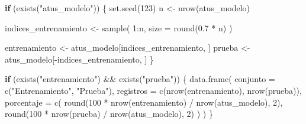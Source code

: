 \documentclass[
  11pt,
  letterpaper,
]{book}
\newenvironment{Shaded}{\begin{snugshade}}{\end{snugshade}}
\newcommand{\AttributeTok}[1]{\textcolor[rgb]{0.40,0.45,0.13}{#1}}
\newcommand{\ControlFlowTok}[1]{\textcolor[rgb]{0.00,0.23,0.31}{\textbf{#1}}}
\newcommand{\DecValTok}[1]{\textcolor[rgb]{0.68,0.00,0.00}{#1}}
\newcommand{\FloatTok}[1]{\textcolor[rgb]{0.68,0.00,0.00}{#1}}
\newcommand{\FunctionTok}[1]{\textcolor[rgb]{0.28,0.35,0.67}{#1}}
\newcommand{\NormalTok}[1]{\textcolor[rgb]{0.00,0.23,0.31}{#1}}
\newcommand{\OtherTok}[1]{\textcolor[rgb]{0.00,0.23,0.31}{#1}}
\newcommand{\SpecialCharTok}[1]{\textcolor[rgb]{0.37,0.37,0.37}{#1}}
\newcommand{\StringTok}[1]{\textcolor[rgb]{0.13,0.47,0.30}{#1}}
\begin{document}
\begin{Shaded}
\begin{Highlighting}[]
\ControlFlowTok{if}\NormalTok{ (}\FunctionTok{exists}\NormalTok{(}\StringTok{"atus\_modelo"}\NormalTok{)) \{}
  \FunctionTok{set.seed}\NormalTok{(}\DecValTok{123}\NormalTok{)}
\NormalTok{  n }\OtherTok{\textless{}{-}} \FunctionTok{nrow}\NormalTok{(atus\_modelo)}

\NormalTok{  indices\_entrenamiento }\OtherTok{\textless{}{-}} \FunctionTok{sample}\NormalTok{(}
    \DecValTok{1}\SpecialCharTok{:}\NormalTok{n,}
    \AttributeTok{size =} \FunctionTok{round}\NormalTok{(}\FloatTok{0.7} \SpecialCharTok{*}\NormalTok{ n)}
\NormalTok{  )}

\NormalTok{  entrenamiento }\OtherTok{\textless{}{-}}\NormalTok{ atus\_modelo[indices\_entrenamiento, ]}
\NormalTok{  prueba }\OtherTok{\textless{}{-}}\NormalTok{ atus\_modelo[}\SpecialCharTok{{-}}\NormalTok{indices\_entrenamiento, ]}
\NormalTok{\}}
\end{Highlighting}
\end{Shaded}

\begin{Shaded}
\begin{Highlighting}[]
\ControlFlowTok{if}\NormalTok{ (}\FunctionTok{exists}\NormalTok{(}\StringTok{"entrenamiento"}\NormalTok{) }\SpecialCharTok{\&\&} \FunctionTok{exists}\NormalTok{(}\StringTok{"prueba"}\NormalTok{)) \{}
  \FunctionTok{data.frame}\NormalTok{(}
    \AttributeTok{conjunto =} \FunctionTok{c}\NormalTok{(}\StringTok{"Entrenamiento"}\NormalTok{, }\StringTok{"Prueba"}\NormalTok{),}
    \AttributeTok{registros =} \FunctionTok{c}\NormalTok{(}\FunctionTok{nrow}\NormalTok{(entrenamiento), }\FunctionTok{nrow}\NormalTok{(prueba)),}
    \AttributeTok{porcentaje =} \FunctionTok{c}\NormalTok{(}
      \FunctionTok{round}\NormalTok{(}\DecValTok{100} \SpecialCharTok{*} \FunctionTok{nrow}\NormalTok{(entrenamiento) }\SpecialCharTok{/} \FunctionTok{nrow}\NormalTok{(atus\_modelo), }\DecValTok{2}\NormalTok{),}
      \FunctionTok{round}\NormalTok{(}\DecValTok{100} \SpecialCharTok{*} \FunctionTok{nrow}\NormalTok{(prueba) }\SpecialCharTok{/} \FunctionTok{nrow}\NormalTok{(atus\_modelo), }\DecValTok{2}\NormalTok{)}
\NormalTok{    )}
\NormalTok{  )}
\NormalTok{\}}
\end{Highlighting}
\end{Shaded}
\end{document}
